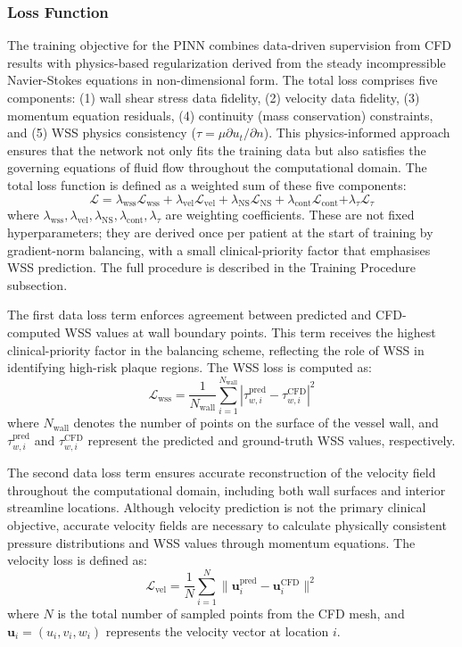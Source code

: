 ﻿\documentclass[12pt,a4paper]{article}
\newcommand{\added}[2][]{\begingroup\color{red}#2\endgroup}
\newcommand{\addp}[1]{\added{#1}}
\theoremstyle{definition}
\numberwithin{equation}{section}
\begin{document}
{
{\subsubsection{Loss Function}}
The training objective for the PINN combines data-driven supervision from CFD results with physics-based regularization derived from the steady incompressible Navier-Stokes equations in non-dimensional form. The total loss comprises five components: (1) wall shear stress data fidelity, (2) velocity data fidelity, (3) momentum equation residuals, (4) continuity (mass conservation) constraints, and (5) WSS physics consistency ($\tau = \mu \partial u_t / \partial n$). This physics-informed approach ensures that the network not only fits the training data but also satisfies the governing equations of fluid flow throughout the computational domain. The total loss function is defined as a weighted sum of these five components:
\begin{equation}
    \mathcal{L} = \lambda_{\text{wss}} \mathcal{L}_{\text{wss}} + \lambda_{\text{vel}} \mathcal{L}_{\text{vel}} + \lambda_{\text{NS}} \mathcal{L}_{\text{NS}} + \lambda_{\text{cont}} \mathcal{L}_{\text{cont}} {+ \lambda_{\tau} \mathcal{L}_{\tau}}
\end{equation}
\addp{where $\lambda_{\text{wss}}, \lambda_{\text{vel}}, \lambda_{\text{NS}}, \lambda_{\text{cont}}, \lambda_{\tau}$ are weighting coefficients. These are not fixed hyperparameters; they are derived once per patient at the start of training by gradient-norm balancing, with a small clinical-priority factor that emphasises WSS prediction. The full procedure is described in the Training Procedure subsection.}

The first data loss term enforces agreement between predicted and CFD-computed WSS values at wall boundary points. \addp{This term receives the highest clinical-priority factor in the balancing scheme, reflecting the role of WSS in identifying high-risk plaque regions.} The WSS loss is computed as:
\begin{equation}
    \mathcal{L}_{\text{wss}} = \frac{1}{N_{\text{wall}}} \sum_{i=1}^{N_{\text{wall}}} |\tau_{w,i}^{\text{pred}} - \tau_{w,i}^{\text{CFD}}|^2
\end{equation}
where $N_{\text{wall}}$ denotes the number of points on the surface of the vessel wall, and $\tau_{w,i}^{\text{pred}}$ and $\tau_{w,i}^{\text{CFD}}$ represent the predicted and ground-truth WSS values, respectively.

The second data loss term ensures accurate reconstruction of the velocity field throughout the computational domain, including both wall surfaces and interior streamline locations. Although velocity prediction is not the primary clinical objective, accurate velocity fields are necessary to calculate physically consistent pressure distributions and WSS values through momentum equations. The velocity loss is defined as:
\begin{equation}
    \mathcal{L}_{\text{vel}} = \frac{1}{N} \sum_{i=1}^{N} \|\mathbf{u}_i^{\text{pred}} - \mathbf{u}_i^{\text{CFD}}\|^2
\end{equation}
where $N$ is the total number of sampled points from the CFD mesh, and $\mathbf{u}_i = (u_i, v_i, w_i)$ represents the velocity vector at location $i$.

}
\end{document}
